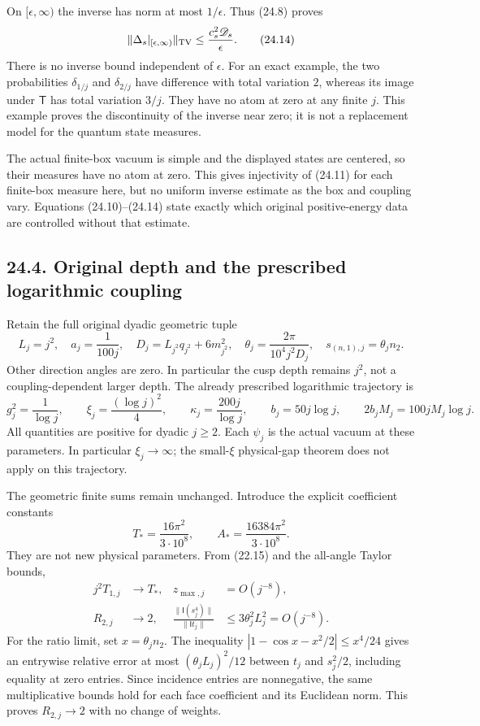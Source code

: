 \documentclass[
]{article}
\begin{document}
On \([\epsilon,\infty)\) the inverse has norm at most \(1/\epsilon\).
Thus (24.8) proves \[
\|\Delta_s|_{[\epsilon,\infty)}\|_{\rm TV}
 \le\frac{c_s^2\mathscr D_s}{\epsilon}.
\tag{24.14}
\] There is no inverse bound independent of \(\epsilon\). For an exact
example, the two probabilities \(\delta_{1/j}\) and \(\delta_{2/j}\)
have difference with total variation \(2\), whereas its image under
\(\mathsf T\) has total variation \(3/j\). They have no atom at zero at
any finite \(j\). This example proves the discontinuity of the inverse
near zero; it is not a replacement model for the quantum state measures.

The actual finite-box vacuum is simple and the displayed states are
centered, so their measures have no atom at zero. This gives injectivity
of (24.11) for each finite-box measure here, but no uniform inverse
estimate as the box and coupling vary. Equations (24.10)--(24.14) state
exactly which original positive-energy data are controlled without that
estimate.

\subsection{24.4. Original depth and the prescribed logarithmic
coupling}\label{original-depth-and-the-prescribed-logarithmic-coupling}

Retain the full original dyadic geometric tuple \[
L_j=j^2,\quad a_j=\frac1{100j},\quad
D_j=L_{j^2}q_{j^2}+6m_{j^2}^2,\quad
\theta_j=\frac{2\pi}{10^4j^2D_j},\quad
s_{(n,1),j}=\theta_jn_2 .
\tag{24.15}
\] Other direction angles are zero. In particular the cusp depth remains
\(j^2\), not a coupling-dependent larger depth. The already prescribed
logarithmic trajectory is \[
g_j^2=\frac1{\log j},\qquad
\xi_j=\frac{(\log j)^2}{4},\qquad
\kappa_j=\frac{200j}{\log j},\qquad
b_j=50j\log j,\qquad 2b_jM_j=100jM_j\log j .
\tag{24.16}
\] All quantities are positive for dyadic \(j\ge2\). Each \(\psi_j\) is
the actual vacuum at these parameters. In particular \(\xi_j\to\infty\);
the small-\(\xi\) physical-gap theorem does not apply on this
trajectory.

The geometric finite sums remain unchanged. Introduce the explicit
coefficient constants \[
T_*=\frac{16\pi^2}{3\cdot10^8},\qquad
A_*=\frac{16384\pi^2}{3\cdot10^8}.
\] They are not new physical parameters. From (22.15) and the all-angle
Taylor bounds, \[
\begin{aligned}
j^2T_{1,j}&\longrightarrow T_*,
&z_{\max,j}&=O(j^{-8}),\\
R_{2,j}&\longrightarrow2,
&\frac{\|\mathsf I(s_j^4)\|}{\|\mathsf It_j\|}
 &\le3\theta_j^2L_j^2=O(j^{-8}).
\end{aligned}\tag{24.17}
\] For the ratio limit, set \(x=\theta_jn_2\). The inequality
\(\left|1-\cos x-x^2/2\right|\le x^4/24\) gives an entrywise relative
error at most \((\theta_jL_j)^2/12\) between \(t_j\) and \(s_j^2/2\),
including equality at zero entries. Since incidence entries are
nonnegative, the same multiplicative bounds hold for each face
coefficient and its Euclidean norm. This proves \(R_{2,j}\to2\) with no
change of weights.
\end{document}
